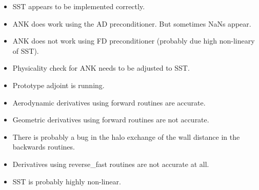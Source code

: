 \begin{itemize}
    \item SST appears to be implemented correctly.

    \item ANK does work using the AD preconditioner. But sometimes NaNs appear.

    \item ANK does not work using FD preconditioner (probably due high
        non-lineary of SST).

    \item Physicality check for ANK needs to be adjusted to SST.

    \item Prototype adjoint is running.

    \item Aerodynamic derivatives using forward routines are accurate.

    \item Geometric derivatives using forward routines are not accurate.

    \item There is probably a bug in the halo exchange of the wall distance in
        the backwards routines.

    \item Derivatives using reverse\_fast routines are not accurate at all.

    \item SST is probably highly non-linear.
\end{itemize}
